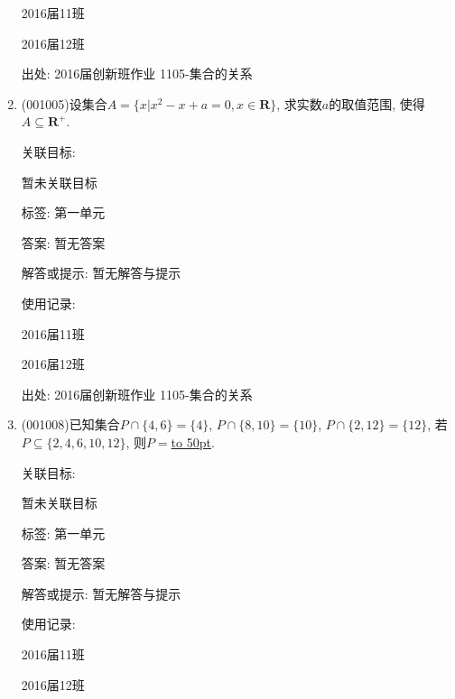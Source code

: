\documentclass[10pt,a4paper]{article}
\newcommand{\blank}[1]{\underline{\hbox to #1pt{}}}
\begin{document}
\begin{enumerate}[1.]
2016届11班	

2016届12班	


出处: 2016届创新班作业	1105-集合的关系
\item { (001005)}设集合$A=\{x|x^2-x+a=0, x \in \mathbf{R}\}$, 求实数$a$的取值范围, 使得$A \subseteq \mathbf{R}^+$.


关联目标:

暂未关联目标



标签: 第一单元

答案: 暂无答案

解答或提示: 暂无解答与提示

使用记录:

2016届11班	

2016届12班	


出处: 2016届创新班作业	1105-集合的关系
\item { (001008)}已知集合$P\cap\{4,6\}=\{4\}$, $P\cap\{8,10\}=\{10\}$, $P\cap\{2,12\}=\{12\}$,
若$P\subseteq\{2,4,6,10,12\}$, 则$P=$\blank{50}.


关联目标:

暂未关联目标



标签: 第一单元

答案: 暂无答案

解答或提示: 暂无解答与提示

使用记录:

2016届11班	

2016届12班	



\end{enumerate}
\end{document}
